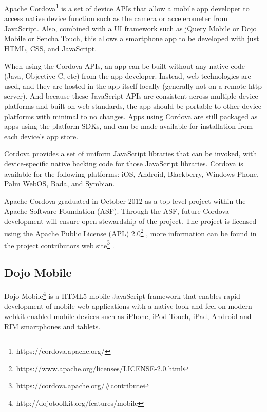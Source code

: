 \documentclass[a4paper,12pt]{book}
\begin{document}
Apache Cordova\footnote{https://cordova.apache.org/} is a set of device APIs that allow a mobile app developer to access native device function such as the camera or accelerometer from JavaScript. Also, combined with a UI framework such as jQuery Mobile or Dojo Mobile or Sencha Touch, this allows a smartphone app to be developed with just HTML, CSS, and JavaScript.

When using the Cordova APIs, an app can be built without any native code (Java, Objective-C, etc) from the app developer. Instead, web technologies are used, and they are hosted in the app itself locally (generally not on a remote http server). And because these JavaScript APIs are consistent across multiple device platforms and built on web standards, the app should be portable to other device platforms with minimal to no changes.
Apps using Cordova are still packaged as apps using the platform SDKs, and can be made available for installation from each device's app store.

Cordova provides a set of uniform JavaScript libraries that can be invoked, with device-specific native backing code for those JavaScript libraries. Cordova is available for the following platforms: iOS, Android, Blackberry, Windows Phone, Palm WebOS, Bada, and Symbian.

Apache Cordova graduated in October 2012 as a top level project within the Apache Software Foundation (ASF). Through the ASF, future Cordova development will ensure open stewardship of the project. The project is licensed using the Apache Public License (APL) 2.0\footnote{https://www.apache.org/licenses/LICENSE-2.0.html} , more information can be found in the project contributors web site\footnote{https://cordova.apache.org/\#contribute} .

\subsection{Dojo Mobile}
\label{Dojo Mobile} 

Dojo Mobile\footnote{http://dojotoolkit.org/features/mobile}  is a HTML5 mobile JavaScript framework that enables rapid development of mobile web applications with a native look and feel on modern webkit-enabled mobile devices such as iPhone, iPod Touch, iPad, Android and RIM smartphones and tablets.
\end{document}
